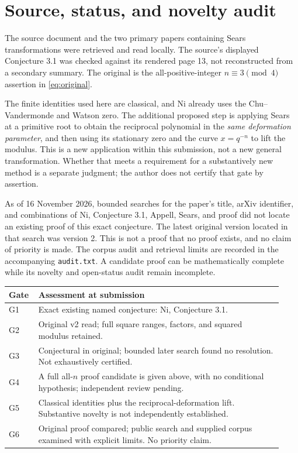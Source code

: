 \documentclass[11pt]{article}
\begin{document}
\section{Source, status, and novelty audit}
The source document and the two primary papers containing Sears
transformations were retrieved and read locally. The source's displayed
Conjecture 3.1 was checked against its rendered page 13, not reconstructed
from a secondary summary. The original is the all-positive-integer
$n\equiv3\pmod4$ assertion in \eqref{eq:original}.

The finite identities used here are classical, and Ni already uses the
Chu--Vandermonde and Watson zero. The additional proposed step is applying
Sears at a primitive root to obtain the reciprocal polynomial in the
\emph{same deformation parameter}, and then using its stationary zero
and the curve $x=q^{-n}$ to lift the modulus. This is a new application
within this submission, not a new general transformation. Whether that
meets a requirement for a substantively new method is a separate
judgment; the author does not certify that gate by assertion.

As of 16 November 2026, bounded searches for the paper's title, arXiv
identifier, and combinations of Ni, Conjecture 3.1, Appell, Sears, and
proof did not locate an existing proof of this exact conjecture. The
latest original version located in that search was version 2. This is
not a proof that no proof exists, and no claim of priority is made.
The corpus audit and retrieval limits are recorded in the accompanying
\texttt{audit.txt}. A candidate proof can be mathematically complete while
its novelty and open-status audit remain incomplete.

\begin{center}\small
\begin{tabular}{@{}p{0.09\linewidth}p{0.84\linewidth}@{}}\toprule
Gate & Assessment at submission\\\midrule
G1 & Exact existing named conjecture: Ni, Conjecture 3.1.\\
G2 & Original v2 read; full square ranges, factors, and squared modulus retained.\\
G3 & Conjectural in original; bounded later search found no resolution. Not exhaustively certified.\\
G4 & A full all-$n$ proof candidate is given above, with no conditional hypothesis; independent review pending.\\
G5 & Classical identities plus the reciprocal-deformation lift. Substantive novelty is not independently established.\\
G6 & Original proof compared; public search and supplied corpus examined with explicit limits. No priority claim.\\\bottomrule
\end{tabular}
\end{center}
\end{document}
